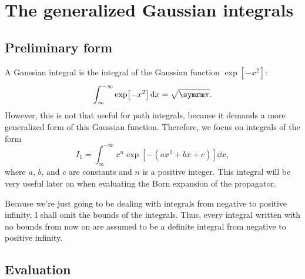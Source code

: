 \chapter{The generalized Gaussian integrals}

\section{Preliminary form}

A Gaussian integral is the integral of the Gaussian function $\exp[-x^2]$:
\begin{equation}
    \int_{\infty}^{-\infty} \exp[-x^2]\dd{x} = \sqrt{\cpi}.
\end{equation}
However, this is not that useful for path integrals, because it demands a more generalized form of this Gaussian function. Therefore, we focus on integrals of the form
\begin{equation}
    I_1 = \int_{\infty}^{-\infty} x^n\exp[-(ax^2 + bx + c)]\dd{x},\label{eq:generalized_gaussian}
\end{equation}
where $a$, $b$, and $c$ are constants and $n$ is a positive integer. This integral will be very useful later on when evaluating the Born expansion of the propagator.

Because we're just going to be dealing with integrals from negative to positive infinity, I shall omit the bounds of the integrals. Thus, every integral written with no bounds from now on are assumed to be a definite integral from negative to positive infinity.

\section{Evaluation}

